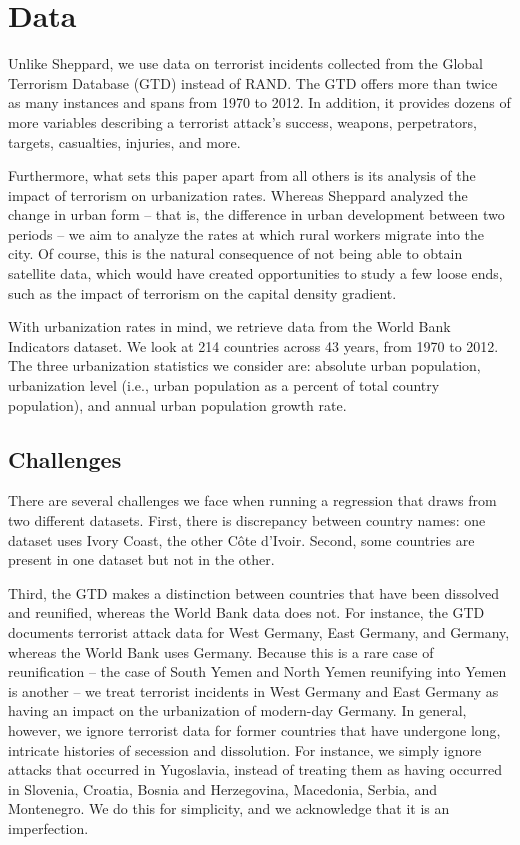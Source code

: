 \documentclass[preprint,2p,12pt]{elsarticle}
\begin{document}
\section{\sc Data}
Unlike Sheppard, we use data on terrorist incidents collected from the Global Terrorism Database (GTD) instead of RAND. The GTD offers more than twice as many instances and spans from 1970 to 2012. In addition, it provides dozens of more variables describing a terrorist attack's success, weapons, perpetrators, targets, casualties, injuries, and more.

Furthermore, what sets this paper apart from all others is its analysis of the impact of terrorism on urbanization rates. Whereas Sheppard analyzed the change in urban form -- that is, the difference in urban development between two periods -- we aim to analyze the rates at which rural workers migrate into the city. Of course, this is the natural consequence of not being able to obtain satellite data, which would have created opportunities to study a few loose ends, such as the impact of terrorism on the capital density gradient. 

With urbanization rates in mind, we retrieve data from the World Bank Indicators dataset. We look at 214 countries across 43 years, from 1970 to 2012.
The three urbanization statistics we consider are: absolute urban population, urbanization level (i.e., urban population as a percent of total country population), and annual urban population growth rate.

\subsection{Challenges}
There are several challenges we face when running a regression that draws from two different datasets.
First, there is discrepancy between country names: one dataset uses Ivory Coast, the other C\^{o}te d'Ivoir.
Second, some countries are present in one dataset but not in the other. 

Third, the GTD makes a distinction between countries that have been dissolved and reunified, whereas the World Bank data does not.
For instance, the GTD documents terrorist attack data for West Germany, East Germany, and Germany, whereas the World Bank uses Germany.
Because this is a rare case of reunification -- the case of South Yemen and North Yemen reunifying into Yemen is another -- we treat terrorist incidents in West Germany and East Germany as having an impact on the urbanization of modern-day Germany.
In general, however, we ignore terrorist data for former countries that have undergone long, intricate histories of secession and dissolution.
For instance, we simply ignore attacks that occurred in Yugoslavia, instead of treating them as having occurred in Slovenia, Croatia, Bosnia and Herzegovina, Macedonia, Serbia, and Montenegro. We do this for simplicity, and we acknowledge that it is an imperfection.
\end{document}
